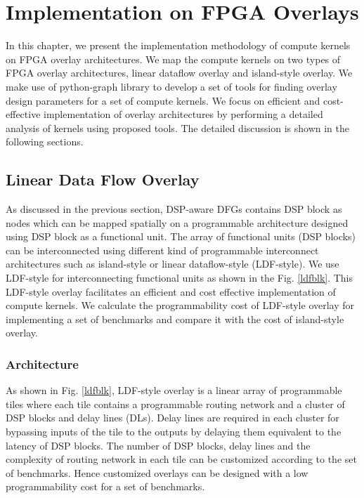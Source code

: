 \chapter{Implementation on FPGA Overlays}
\label{ch5_implementation}

In this chapter, we present the implementation methodology of compute kernels on FPGA overlay architectures.
We map the compute kernels on two types of FPGA overlay architectures, linear dataflow overlay and island-style overlay.
We make use of python-graph library to develop a set of tools for finding overlay design parameters for a set of compute kernels.
We focus on efficient and cost-effective implementation of overlay architectures by performing a detailed analysis of kernels using proposed tools.
The detailed discussion is shown in the following sections.

\section{Linear Data Flow Overlay}
As discussed in the previous section, DSP-aware DFGs contains DSP block as nodes which can be mapped spatially on a programmable architecture designed using DSP block as a functional unit.
The array of functional units (DSP blocks) can be interconnected using different kind of programmable interconnect architectures such as island-style or linear dataflow-style (LDF-style).
We use LDF-style for interconnecting functional units as shown in the Fig. \ref{ldfblk}.
This LDF-style overlay facilitates an efficient and cost effective implementation of compute kernels. 
We calculate the programmability cost of LDF-style overlay for implementing a set of benchmarks and compare it with the cost of island-style overlay.

\subsection{Architecture}
As shown in Fig. \ref{ldfblk}, LDF-style overlay is a linear array of programmable tiles where each tile contains a programmable routing network and a cluster of DSP blocks and delay lines (DLs). 
Delay lines are required in each cluster for bypassing inputs of the tile to the outputs by delaying them equivalent to the latency of DSP blocks.
The number of DSP blocks, delay lines and the complexity of routing network in each tile can be customized according to the set of benchmarks.
Hence customized overlays can be designed with a low programmability cost for a set of benchmarks.


